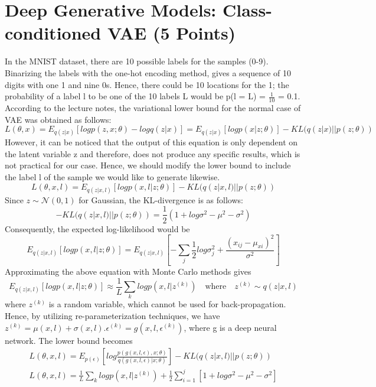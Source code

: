 \documentclass[12pt,a4paper]{article}
\begin{document}
	\section{Deep Generative Models: Class-conditioned VAE (5 Points)}
	In the MNIST dataset, there are 10 possible labels for the samples (0-9). Binarizing the labels with the one-hot encoding method, gives a sequence of 10 digits with one 1 and nine 0s. Hence, there could be 10 locations for the 1; the probability of a label l to be one of the 10 labels L would be p(l = L) = $\frac{1}{10}$ = 0.1. According to the lecture notes, the variational lower bound for the normal case of VAE was obtained as follows:
	\begin{equation*}
		L(\theta, x) = E_{q(z|x)}[logp(z,x;\theta)- logq(z|x)]=E_{q(z|x)}[logp(x|z;\theta)]- KL(q(z|x)||p(z;\theta))
	\end{equation*}
	However, it can be noticed that the output of this equation is only dependent on the latent variable z and therefore, does not produce any specific results, which is not practical for our case. Hence, we should modify the lower bound to include the label l of the sample we would like to generate likewise. 
	\begin{equation*}
		L(\theta, x, l) = E_{q(z|x, l)}[logp(x, l|z;\theta)]- KL(q(z|x, l)||p(z;\theta))
	\end{equation*}
	Since $z\sim \mathcal{N}(0, 1)$ for Gaussian,  the KL-divergence is as follows:
	\begin{equation}
		- KL(q(z|x, l)||p(z;\theta)) = \frac{1}{2}(1+log\sigma^2-\mu^2-\sigma^2)
	\end{equation}
	Consequently, the expected log-likelihood would be
	\begin{equation}
		E_{q(z|x, l)}[logp(x, l|z;\theta)] = E_{q(z|x, l)}[-\sum_{j}\frac{1}{2}	log\sigma_j^2+\frac{(x_{ij}-\mu_{xi})^2}{\sigma^2}]
	\end{equation}
	Approximating the above equation with Monte Carlo methods gives
	\begin{equation}
		E_{q(z|x, l)}[logp(x, l|z;\theta)] \approx \frac{1}{L}\sum_{k}logp(x,l|z^{(k)})\quad\text{where}\quad z^{(k)} \sim q(z|x,l)
	\end{equation}
	where $z^{(k)}$ is a random variable, which cannot be used for back-propagation. Hence, by utilizing re-parameterization techniques, we have $z^{(k)} = \mu(x, l)+\sigma(x, l).\epsilon^{(k)} = g(x, l, \epsilon^{(k)})$, where g is a deep neural network. The lower bound becomes
	\begin{align*}
		L(\theta, x, l) = E_{p(\epsilon)}[log\frac{p(g(x,l,\epsilon),x;\theta)}{q(g(x,l,\epsilon)|x;\theta)}]- KL(q(z|x, l)||p(z;\theta)) \\
		L(\theta, x, l) = \frac{1}{L}\sum_{k}logp(x,l|z^{(k)}) +\frac{1}{2}\sum_{i=1}^{j}[1+log\sigma^2-\mu^2-\sigma^2]
	\end{align*}
\end{document}
